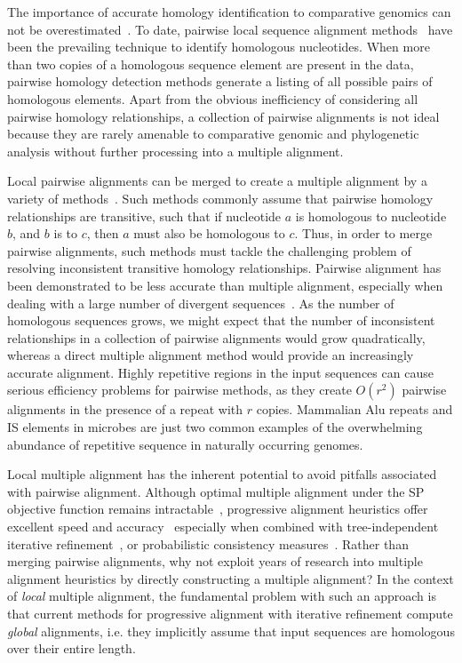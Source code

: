 \documentclass{ws-procs9x6}
\begin{document}
The importance of accurate homology identification to comparative genomics can not be overestimated~\cite{Kumar07}. To date, pairwise local sequence alignment methods~\cite{ref-blastz, ref-ssearch,repseek} have been the prevailing technique to identify homologous nucleotides.  When more than two copies of a homologous sequence element are present in the data, pairwise homology detection methods generate a listing of all possible pairs of homologous elements.  Apart from the obvious inefficiency of considering all pairwise homology relationships, a collection of pairwise alignments is not ideal because they are rarely amenable to comparative genomic and phylogenetic analysis without further processing into a multiple alignment.

Local pairwise alignments can be merged to create a multiple alignment by a variety of methods~\cite{ref-tba,ref-aba,ref-dialign,ref-related1}. Such methods commonly assume that pairwise homology relationships are transitive, such that if nucleotide $a$ is homologous to nucleotide $b$, and $b$ is to $c$, then $a$ must also be homologous to $c$.  Thus, in order to merge pairwise alignments, such methods must tackle the challenging problem of resolving inconsistent transitive homology relationships.  Pairwise alignment has been demonstrated to be less accurate than multiple alignment, especially when dealing with a large number of divergent sequences~\cite{ref-mlagan,ref-aubergene}.  As the number of homologous sequences grows, we might expect that the number of inconsistent relationships in a collection of pairwise alignments would grow quadratically, whereas a direct multiple alignment method would provide an increasingly accurate alignment.  Highly repetitive regions in the input sequences can cause serious efficiency problems for pairwise methods, as they create $O(r^{2})$ pairwise alignments in the presence of a repeat with $r$ copies.  Mammalian Alu repeats and IS elements in microbes are just two common examples of the overwhelming abundance of repetitive sequence in naturally occurring genomes.

Local multiple alignment has the inherent potential to avoid pitfalls associated with pairwise alignment. Although optimal multiple alignment under the SP objective function remains intractable~\cite{ref-wangjiang}, progressive alignment heuristics offer excellent speed and accuracy~\cite{ref-clustalw, ref-tcoffee} especially when combined with tree-independent iterative refinement~\cite{ref-muscle}, or probabilistic consistency measures~\cite{ref-probcons}. Rather than merging pairwise alignments, why not exploit years of research into multiple alignment heuristics by directly constructing a multiple alignment?   In the context of \textit{local} multiple alignment, the fundamental problem with such an approach is that current methods for progressive alignment with iterative refinement compute \textit{global} alignments, i.e. they implicitly assume that input sequences are homologous over their entire length.
\end{document}
